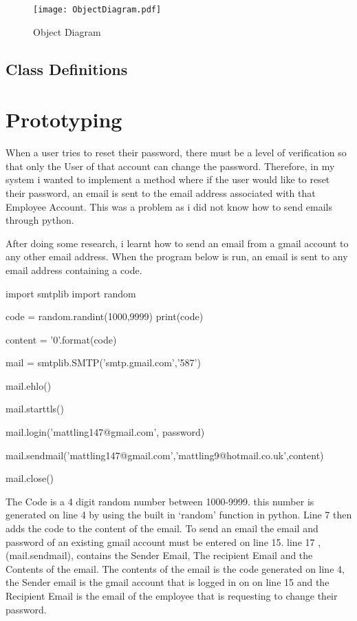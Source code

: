 \begin{figure}[H]
\caption{Object Diagram} \label{fig:Object Diagram}
\hfill\texttt{[image: ObjectDiagram.pdf]}\hspace*{\fill}
\end{figure}

\subsection{Class Definitions}

\section{Prototyping}

When a user tries to reset their password, there must be a level of verification so that only the User of that account can change the password. Therefore, in my system i wanted to implement a method where if the user would like to reset their password, an email is sent to the email address associated with that Employee Account. This was a problem as i did not know how to send emails through python. \par

After doing some research, i learnt how to send an email from a gmail account to any other email address. When the program below is run, an email is sent to any email address containing a code.

\begin{python}
import smtplib
import random

code = random.randint(1000,9999)
print(code)

content = '{0}'.format(code)

mail = smtplib.SMTP('smtp.gmail.com','587')

mail.ehlo()

mail.starttls()

mail.login('mattling147@gmail.com', password)

mail.sendmail('mattling147@gmail.com','mattling9@hotmail.co.uk',content)

mail.close()

\end{python}

The Code is a 4 digit random number between 1000-9999. this number is generated on line 4 by using the built in `random' function in python. Line 7 then adds the code to the content of the email. To send an email the email and password of an existing gmail account must be entered on line 15. line 17 , (mail.sendmail), contains the Sender Email, The recipient Email and the Contents of the email. The contents of the email is the code generated on line 4, the Sender email is the gmail account that is logged in on on line 15 and the Recipient Email is the email of the employee that is requesting to change their password.


